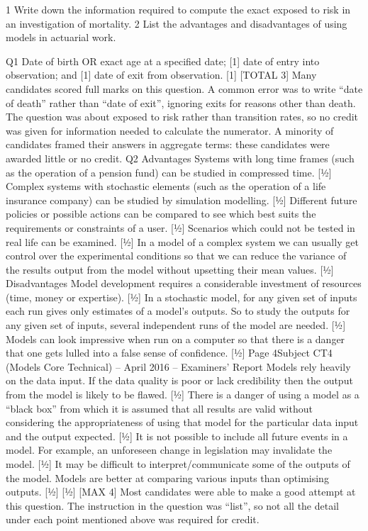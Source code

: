 \documentclass[a4paper,12pt]{article}
\begin{document}
1
Write down the information required to compute the exact exposed to risk in an
investigation of mortality. 
2 List the advantages and disadvantages of using models in actuarial work. 


Q1
Date of birth
OR
exact age at a specified date; [1]
date of entry into observation; and [1]
date of exit from observation.
[1]
[TOTAL 3]
Many candidates scored full marks on this question. A common error was to
write “date of death” rather than “date of exit”, ignoring exits for reasons other
than death. The question was about exposed to risk rather than transition
rates, so no credit was given for information needed to calculate the
numerator. A minority of candidates framed their answers in aggregate
terms: these candidates were awarded little or no credit.
Q2
Advantages
Systems with long time frames (such as the operation of a pension fund) can be
studied in compressed time.
[1⁄2]
Complex systems with stochastic elements (such as the operation of a life insurance
company) can be studied by simulation modelling.
[1⁄2]
Different future policies or possible actions can be compared to see which best suits
the requirements or constraints of a user.
[1⁄2]
Scenarios which could not be tested in real life can be examined.
[1⁄2]
In a model of a complex system we can usually get control over the experimental
conditions so that we can reduce the variance of the results output from the model
without upsetting their mean values.
[1⁄2]
Disadvantages
Model development requires a considerable investment of resources (time, money or
expertise).
[1⁄2]
In a stochastic model, for any given set of inputs each run gives only estimates of a
model’s outputs. So to study the outputs for any given set of inputs, several
independent runs of the model are needed.
[1⁄2]
Models can look impressive when run on a computer so that there is a danger that one
gets lulled into a false sense of confidence.
[1⁄2]
Page 4Subject CT4 (Models Core Technical) – April 2016 – Examiners’ Report
Models rely heavily on the data input. If the data quality is poor or lack credibility
then the output from the model is likely to be flawed.
[1⁄2]
There is a danger of using a model as a “black box” from which it is assumed that all
results are valid without considering the appropriateness of using that model for the
particular data input and the output expected.
[1⁄2]
It is not possible to include all future events in a model. For example, an unforeseen
change in legislation may invalidate the model.
[1⁄2]
It may be difficult to interpret/communicate some of the outputs of the model.
Models are better at comparing various inputs than optimising outputs.
[1⁄2]
[1⁄2]
[MAX 4]
Most candidates were able to make a good attempt at this question. The
instruction in the question was “list”, so not all the detail under each point
mentioned above was required for credit.
\end{document}
